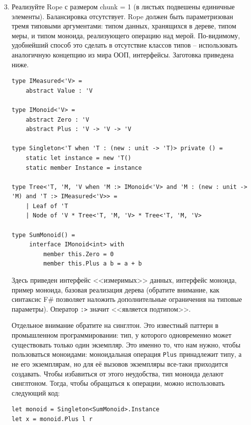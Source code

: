\documentclass[a4paper,11pt]{article}
\begin{document}
\begin{enumerate}[{3-}1]
  \setcounter{enumi}{2}
\item Реализуйте Rope с размером chunk = 1 (в листьях подвешены единичные
элементы). Балансировка отсутствует. Rope должен быть параметризован тремя
типовыми аргументами: типом данных, хранящихся в дереве, типом меры, и типом
моноида, реализующего операцию над мерой. По-видимому, удобнейший способ это
сделать в отсутствие классов типов -- использовать аналогичную концепцию из
мира ООП, интерфейсы. Заготовка приведена ниже.
\begin{lstlisting}
type IMeasured<'V> = 
    abstract Value : 'V
    
type IMonoid<'V> = 
    abstract Zero : 'V
    abstract Plus : 'V -> 'V -> 'V
    
type Singleton<'T when 'T : (new : unit -> 'T)> private () = 
    static let instance = new 'T()
    static member Instance = instance
    
type Tree<'T, 'M, 'V when 'M :> IMonoid<'V> and 'M : (new : unit -> 'M) and 'T :> IMeasured<'V>> = 
    | Leaf of 'T 
    | Node of 'V * Tree<'T, 'M, 'V> * Tree<'T, 'M, 'V>

type SumMonoid() = 
     interface IMonoid<int> with
         member this.Zero = 0
         member this.Plus a b = a + b
\end{lstlisting}

Здесь приведен интерфейс <<измеримых>> данных, интерфейс моноида, пример
моноида, базовая реализация дерева (обратите внимание, как синтаксис F\#
позволяет наложить дополнительные ограничения на типовые параметры).
Оператор \texttt{:>} значит <<является подтипом>>.

Отдельное внимание обратите на синглтон. Это известный паттерн в промышленном
программировании: тип, у которого одновременно может существовать только один
экземпляр. Это именно то, что нам нужно, чтобы пользоваться моноидами:
моноидальная операция \texttt{Plus} принадлежит типу, а не его экземплярам,
но для её вызовов экземпляры все-таки приходится создавать. Чтобы избавиться
от этого неудобства, тип моноида делают синглтоном. Тогда, чтобы обращаться к
операции, можно использовать следующий код:
\begin{lstlisting}
let monoid = Singleton<SumMonoid>.Instance
let x = monoid.Plus l r
\end{lstlisting}


\end{enumerate}
\end{document}
